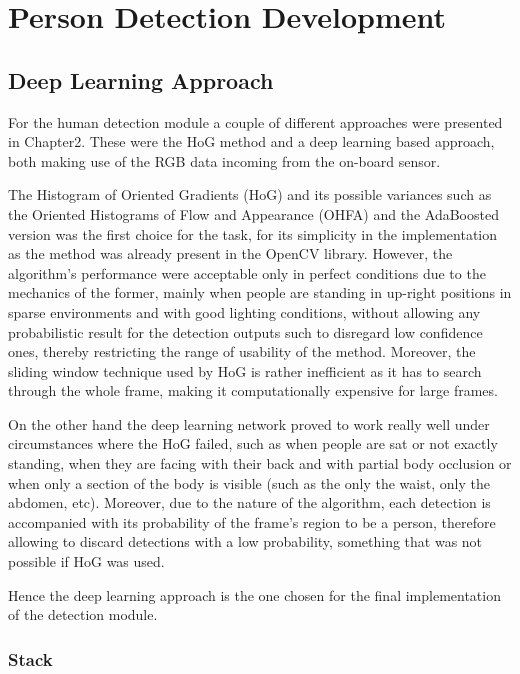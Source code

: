 \chapter{Person Detection Development}
\label{chapter3}

\section{Deep Learning Approach}

For the human detection module a couple of different approaches were presented in Chapter2. These were the HoG method and a deep learning based approach, both making use of the RGB data incoming from the on-board sensor.

The Histogram of Oriented Gradients (HoG) and its possible variances such as the Oriented Histograms of Flow and Appearance (OHFA) and the AdaBoosted version was the first choice for the task, for its simplicity in the implementation as the method was already present in the OpenCV library. However, the algorithm's performance were acceptable only in perfect conditions due to the mechanics of the former, mainly when people are standing in up-right positions in sparse environments and with good lighting conditions, without allowing any probabilistic result for the detection outputs such to disregard low confidence ones, thereby restricting the range of usability of the method. Moreover, the sliding window technique used by HoG is rather inefficient as it has to search through the whole frame, making it computationally expensive for large frames.

On the other hand the deep learning network proved to work really well under circumstances where the HoG failed, such as when people are sat or not exactly standing, when they are facing with their back and with partial body occlusion or when only a section of the body is visible (such as the only the waist, only the abdomen, etc). Moreover, due to the nature of the algorithm, each detection is accompanied with its probability of the frame's region to be a person, therefore allowing to discard detections with a low probability, something that was not possible if HoG was used.

Hence the deep learning approach is the one chosen for the final implementation of the detection module.

\subsection{Stack}

